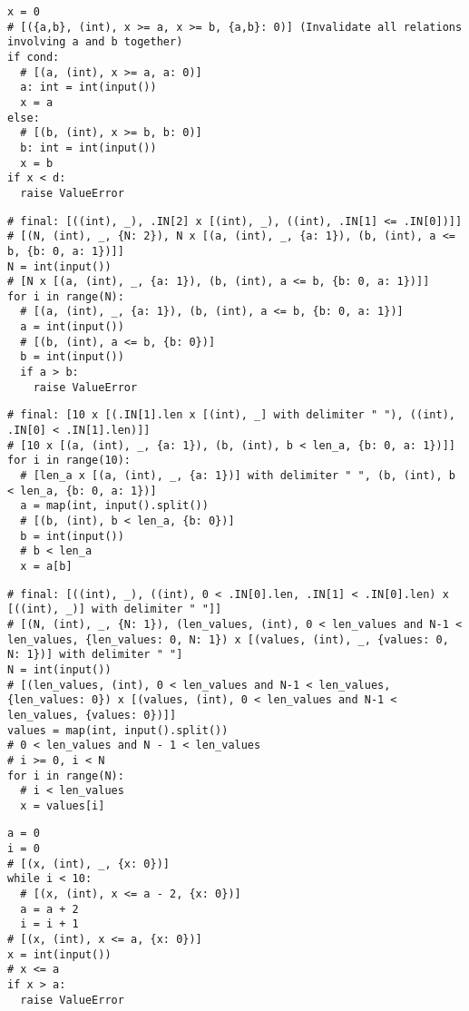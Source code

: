 \documentclass[11pt]{article}
\begin{document}
\begin{lstlisting}
x = 0
# [({a,b}, (int), x >= a, x >= b, {a,b}: 0)] (Invalidate all relations involving a and b together)
if cond:
  # [(a, (int), x >= a, a: 0)]
  a: int = int(input())
  x = a
else:
  # [(b, (int), x >= b, b: 0)]
  b: int = int(input())
  x = b
if x < d:
  raise ValueError
\end{lstlisting}

\begin{lstlisting}
# final: [((int), _), .IN[2] x [(int), _), ((int), .IN[1] <= .IN[0])]]
# [(N, (int), _, {N: 2}), N x [(a, (int), _, {a: 1}), (b, (int), a <= b, {b: 0, a: 1})]]
N = int(input())
# [N x [(a, (int), _, {a: 1}), (b, (int), a <= b, {b: 0, a: 1})]]
for i in range(N):
  # [(a, (int), _, {a: 1}), (b, (int), a <= b, {b: 0, a: 1})]
  a = int(input())
  # [(b, (int), a <= b, {b: 0})]
  b = int(input())
  if a > b:
    raise ValueError
\end{lstlisting}

\begin{lstlisting}
# final: [10 x [(.IN[1].len x [(int), _] with delimiter " "), ((int), .IN[0] < .IN[1].len)]]
# [10 x [(a, (int), _, {a: 1}), (b, (int), b < len_a, {b: 0, a: 1})]]
for i in range(10):
  # [len_a x [(a, (int), _, {a: 1})] with delimiter " ", (b, (int), b < len_a, {b: 0, a: 1})]
  a = map(int, input().split())
  # [(b, (int), b < len_a, {b: 0})]
  b = int(input())
  # b < len_a
  x = a[b]
\end{lstlisting}

\begin{lstlisting}
# final: [((int), _), ((int), 0 < .IN[0].len, .IN[1] < .IN[0].len) x [((int), _)] with delimiter " "]]
# [(N, (int), _, {N: 1}), (len_values, (int), 0 < len_values and N-1 < len_values, {len_values: 0, N: 1}) x [(values, (int), _, {values: 0, N: 1})] with delimiter " "]
N = int(input())
# [(len_values, (int), 0 < len_values and N-1 < len_values, {len_values: 0}) x [(values, (int), 0 < len_values and N-1 < len_values, {values: 0})]]
values = map(int, input().split())
# 0 < len_values and N - 1 < len_values
# i >= 0, i < N
for i in range(N):
  # i < len_values
  x = values[i]
\end{lstlisting}

\begin{lstlisting}
a = 0
i = 0
# [(x, (int), _, {x: 0})]
while i < 10:
  # [(x, (int), x <= a - 2, {x: 0})]
  a = a + 2
  i = i + 1
# [(x, (int), x <= a, {x: 0})]
x = int(input())
# x <= a
if x > a:
  raise ValueError
\end{lstlisting}
\end{document}
